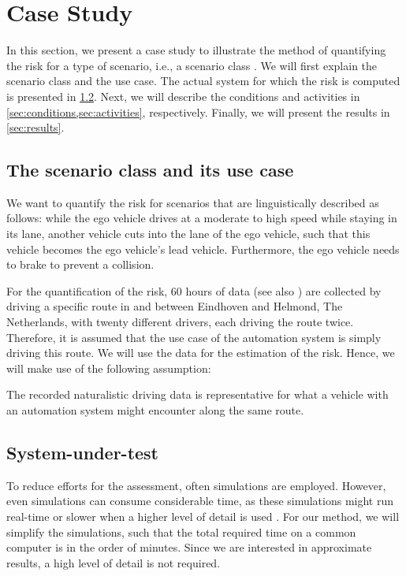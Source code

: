 \section{Case Study} %
\label{sec:example}

In this section, we present a case study to illustrate the method of quantifying the risk for a type of scenario, i.e., a scenario class \cite{elrofai2018scenario}. We will first explain the scenario class and the use case. The actual system for which the risk is computed is presented in \cref{sec:system}. Next, we will describe the conditions and activities in \cref{sec:conditions,sec:activities}, respectively. Finally, we will present the results in \cref{sec:results}.

\subsection{The scenario class and its use case}
\label{sec:scenario class}

We want to quantify the risk for scenarios that are linguistically described as follows: while the ego vehicle drives at a moderate to high speed while staying in its lane, another vehicle cuts into the lane of the ego vehicle, such that this vehicle becomes the ego vehicle's lead vehicle. Furthermore, the ego vehicle needs to brake to prevent a collision.

For the quantification of the risk, 60 hours of data (see also \cite{deGelder2017assessment}) are collected by driving a specific route in and between Eindhoven and Helmond, The Netherlands, with twenty different drivers, each driving the route twice. Therefore, it is assumed that the use case of the automation system is simply driving this route. We will use the data for the estimation of the risk. Hence, we will make use of the following assumption:
\begin{assumption}
	The recorded naturalistic driving data is representative for what a vehicle with an automation system might encounter along the same route.
\end{assumption}

\subsection{System-under-test}
\label{sec:system}

To reduce efforts for the assessment, often simulations are employed. However, even simulations can consume considerable time, as these simulations might run real-time \cite{shah2018airsim} or slower when a higher level of detail is used \cite{zofka2016testing}. For our method, we will simplify the simulations, such that the total required time on a common computer is in the order of minutes. Since we are interested in approximate results, a high level of detail is not required. 

